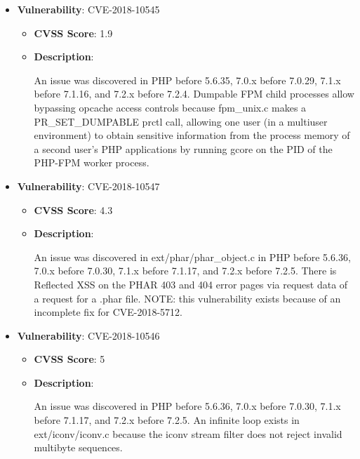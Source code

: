 \documentclass{article}
\begin{document}
\begin{itemize}
        \item \textbf{Vulnerability}: CVE-2018-10545
        \begin{itemize}
            \item \textbf{CVSS Score}:  1.9 
            \item \textbf{Description}:
            \parbox[t]{0.9\linewidth}{
                \ttfamily An issue was discovered in PHP before 5.6.35, 7.0.x before 7.0.29, 7.1.x before 7.1.16, and 7.2.x before 7.2.4. Dumpable FPM child processes allow bypassing opcache access controls because fpm\_unix.c makes a PR\_SET\_DUMPABLE prctl call, allowing one user (in a multiuser environment) to obtain sensitive information from the process memory of a second user's PHP applications by running gcore on the PID of the PHP-FPM worker process.
            }
        \end{itemize}
    
        \item \textbf{Vulnerability}: CVE-2018-10547
        \begin{itemize}
            \item \textbf{CVSS Score}:  4.3 
            \item \textbf{Description}:
            \parbox[t]{0.9\linewidth}{
                \ttfamily An issue was discovered in ext/phar/phar\_object.c in PHP before 5.6.36, 7.0.x before 7.0.30, 7.1.x before 7.1.17, and 7.2.x before 7.2.5. There is Reflected XSS on the PHAR 403 and 404 error pages via request data of a request for a .phar file. NOTE: this vulnerability exists because of an incomplete fix for CVE-2018-5712.
            }
        \end{itemize}
    
        \item \textbf{Vulnerability}: CVE-2018-10546
        \begin{itemize}
            \item \textbf{CVSS Score}:  5 
            \item \textbf{Description}:
            \parbox[t]{0.9\linewidth}{
                \ttfamily An issue was discovered in PHP before 5.6.36, 7.0.x before 7.0.30, 7.1.x before 7.1.17, and 7.2.x before 7.2.5. An infinite loop exists in ext/iconv/iconv.c because the iconv stream filter does not reject invalid multibyte sequences.
            }
        \end{itemize}
    

\end{itemize}
\end{document}
